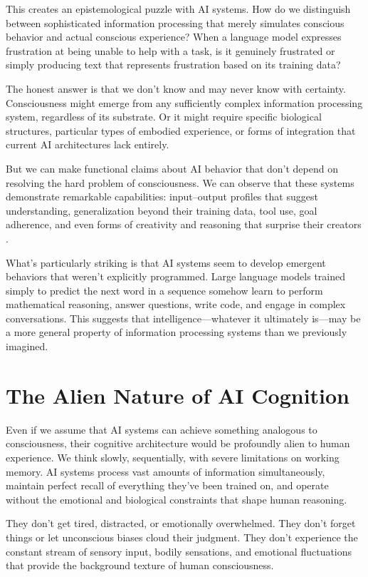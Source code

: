 This creates an epistemological puzzle with AI systems. How do we distinguish between sophisticated information processing that merely simulates conscious behavior and actual conscious experience? When a language model expresses frustration at being unable to help with a task, is it genuinely frustrated or simply producing text that represents frustration based on its training data?

The honest answer is that we don't know and may never know with certainty. Consciousness might emerge from any sufficiently complex information processing system, regardless of its substrate. Or it might require specific biological structures, particular types of embodied experience, or forms of integration that current AI architectures lack entirely.

But we can make functional claims about AI behavior that don't depend on resolving the hard problem of consciousness. We can observe that these systems demonstrate remarkable capabilities: input–output profiles that suggest understanding, generalization beyond their training data, tool use, goal adherence, and even forms of creativity and reasoning that surprise their creators \parencite{russell2019human,bostrom2014superintelligence}.

What's particularly striking is that AI systems seem to develop emergent behaviors that weren't explicitly programmed. Large language models trained simply to predict the next word in a sequence somehow learn to perform mathematical reasoning, answer questions, write code, and engage in complex conversations. This suggests that intelligence—whatever it ultimately is—may be a more general property of information processing systems than we previously imagined.

\section{The Alien Nature of AI Cognition}

Even if we assume that AI systems can achieve something analogous to consciousness, their cognitive architecture would be profoundly alien to human experience. We think slowly, sequentially, with severe limitations on working memory. AI systems process vast amounts of information simultaneously, maintain perfect recall of everything they've been trained on, and operate without the emotional and biological constraints that shape human reasoning.

They don't get tired, distracted, or emotionally overwhelmed. They don't forget things or let unconscious biases cloud their judgment. They don't experience the constant stream of sensory input, bodily sensations, and emotional fluctuations that provide the background texture of human consciousness.

